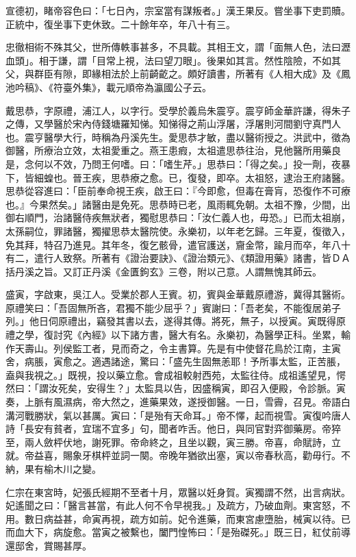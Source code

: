 \begin{pinyinscope}
宣德初，睹帝容色曰：「七日內，宗室當有謀叛者。」漢王果反。嘗坐事下吏罰贖。正統中，復坐事下吏休致。二十餘年卒，年八十有三。

忠徹相術不殊其父，世所傳軼事甚多，不具載。其相王文，謂「面無人色，法曰瀝血頭」。相于謙，謂「目常上視，法曰望刀眼」。後果如其言。然性陰險，不如其父，與群臣有隙，即緣相法於上前齮齕之。頗好讀書，所著有《人相大成》及《鳳池吟稿》、《符臺外集》，載元順帝為瀛國公子云。

戴思恭，字原禮，浦江人，以字行。受學於義烏朱震亨。震亨師金華許謙，得朱子之傳，又學醫於宋內侍錢塘羅知悌。知悌得之荊山浮屠，浮屠則河間劉守真門人也。震亨醫學大行，時稱為丹溪先生。愛思恭才敏，盡以醫術授之。洪武中，徵為御醫，所療治立效，太祖愛重之。燕王患瘕，太祖遣思恭往治，見他醫所用藥良是，念何以不效，乃問王何嗜。曰：「嗜生芹。」思恭曰：「得之矣。」投一劑，夜暴下，皆細蝗也。晉王疾，思恭療之愈。已，復發，即卒。太祖怒，逮治王府諸醫。思恭從容進曰：「臣前奉命視王疾，啟王曰：『今即愈，但毒在膏肓，恐復作不可療也。』今果然矣。」諸醫由是免死。思恭時已老，風雨輒免朝。太祖不豫，少間，出御右順門，治諸醫侍疾無狀者，獨慰思恭曰：「汝仁義人也，毋恐。」已而太祖崩，太孫嗣位，罪諸醫，獨擢思恭太醫院使。永樂初，以年老乞歸。三年夏，復徵入，免其拜，特召乃進見。其年冬，復乞骸骨，遣官護送，齎金幣，踰月而卒，年八十有二，遣行人致祭。所著有《證治要訣》、《證治類元》、《類證用藥》諸書，皆ＤＡ括丹溪之旨。又訂正丹溪《金匱鉤玄》三卷，附以己意。人謂無愧其師云。

盛寅，字啟東，吳江人。受業於郡人王賓。初，賓與金華戴原禮游，冀得其醫術。原禮笑曰：「吾固無所吝，君獨不能少屈乎？」賓謝曰：「吾老矣，不能復居弟子列。」他日伺原禮出，竊發其書以去，遂得其傳。將死，無子，以授寅。寅既得原禮之學，復討究《內經》以下諸方書，醫大有名。永樂初，為醫學正科。坐累，輸作天壽山。列侯監工者，見而奇之，令主書算。先是有中使督花鳥於江南，主寅舍，病脹，寅愈之。適遇諸途，驚曰：「盛先生固無恙耶！予所事太監，正苦脹，盍與我視之。」既視，投以藥立愈。會成祖較射西苑，太監往侍。成祖遙望見，愕然曰：「謂汝死矣，安得生？」太監具以告，因盛稱寅，即召入便殿，令診脈。寅奏，上脈有風濕病，帝大然之，進藥果效，遂授御醫。一日，雪霽，召見。帝語白溝河戰勝狀，氣以甚厲。寅曰：「是殆有天命耳。」帝不懌，起而視雪。寅復吟唐人詩「長安有貧者，宜瑞不宜多」句，聞者咋舌。他日，與同官對弈御藥房。帝猝至，兩人斂枰伏地，謝死罪。帝命終之，且坐以觀，寅三勝。帝喜，命賦詩，立就。帝益喜，賜象牙棋枰並詞一闋。帝晚年猶欲出塞，寅以帝春秋高，勸毋行。不納，果有榆木川之變。

仁宗在東宮時，妃張氏經期不至者十月，眾醫以妊身賀。寅獨謂不然，出言病狀。妃遙聞之曰：「醫言甚當，有此人何不令早視我。」及疏方，乃破血劑。東宮怒，不用。數日病益甚，命寅再視，疏方如前。妃令進藥，而東宮慮墮胎，械寅以待。已而血大下，病旋愈。當寅之被繫也，闔門惶怖曰：「是殆磔死。」既三日，紅仗前導還邸舍，賞賜甚厚。


\end{pinyinscope}
